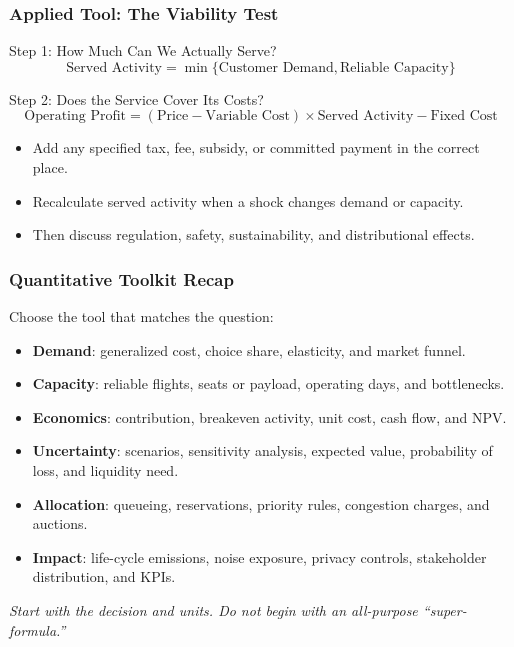 \documentclass{beamer}
\begin{document}
\begin{frame}[t]
\frametitle{Applied Tool: The Viability Test}
\begin{block}{Step 1: How Much Can We Actually Serve?}
\[
\text{Served Activity}
=
\min\{\text{Customer Demand},\text{Reliable Capacity}\}
\]
\end{block}
\begin{block}{Step 2: Does the Service Cover Its Costs?}
\[
\text{Operating Profit}
=
(\text{Price}-\text{Variable Cost})
\times\text{Served Activity}
-\text{Fixed Cost}
\]
\end{block}
\begin{itemize}
\item Add any specified tax, fee, subsidy, or committed payment in the correct place.
\item Recalculate served activity when a shock changes demand or capacity.
\item Then discuss regulation, safety, sustainability, and distributional effects.
\end{itemize}
\end{frame}

\begin{frame}[t]
\frametitle{Quantitative Toolkit Recap}
Choose the tool that matches the question:
\begin{itemize}
\item \textbf{Demand}: generalized cost, choice share, elasticity, and market funnel.
\item \textbf{Capacity}: reliable flights, seats or payload, operating days, and bottlenecks.
\item \textbf{Economics}: contribution, breakeven activity, unit cost, cash flow, and NPV.
\item \textbf{Uncertainty}: scenarios, sensitivity analysis, expected value, probability of loss, and liquidity need.
\item \textbf{Allocation}: queueing, reservations, priority rules, congestion charges, and auctions.
\item \textbf{Impact}: life-cycle emissions, noise exposure, privacy controls, stakeholder distribution, and KPIs.
\end{itemize}
\textit{Start with the decision and units. Do not begin with an all-purpose ``super-formula.''}
\end{frame}
\end{document}
